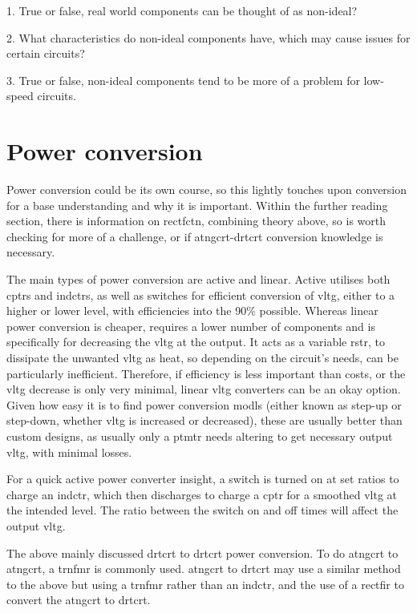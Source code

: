 \documentclass[a4paper,11pt]{report}
\begin{document}
1. True or false, real world components can be thought of as non-ideal?

2. What characteristics do non-ideal components have, which may cause issues for certain circuits?

3. True or false, non-ideal components tend to be more of a problem for low-speed circuits.

\pagebreak

\section{Power conversion}

Power conversion could be its own course, so this lightly touches upon conversion for a base understanding and why it is important. Within the further reading section, there is information on \gls{rectfctn}, combining theory above, so is worth checking for more of a challenge, or if \gls{atngcrt}-\gls{drtcrt} conversion knowledge is necessary.

The main types of power conversion are active and linear. Active utilises both \gls{cptr}s and \gls{indctr}s, as well as switches for efficient conversion of \gls{vltg}, either to a higher or lower level, with efficiencies into the 90\% possible. Whereas linear power conversion is cheaper, requires a lower number of components and is specifically for decreasing the \gls{vltg} at the output. It acts as a variable \gls{rstr}, to dissipate the unwanted \gls{vltg} as heat, so depending on the circuit's needs, can be particularly inefficient. Therefore, if efficiency is less important than costs, or the \gls{vltg} decrease is only very minimal, linear \gls{vltg} converters can be an okay option. Given how easy it is to find power conversion \gls{modl}s (either known as step-up or step-down, whether \gls{vltg} is increased or decreased), these are usually better than custom designs, as usually only a \gls{ptmtr} needs altering to get necessary output \gls{vltg}, with minimal losses.

For a quick active power converter insight, a switch is turned on at set ratios to charge an \gls{indctr}, which then discharges to charge a \gls{cptr} for a smoothed \gls{vltg} at the intended level. The ratio between the switch on and off times will affect the output \gls{vltg}.

The above mainly discussed \gls{drtcrt} to \gls{drtcrt} power conversion. To do \gls{atngcrt} to \gls{atngcrt}, a \gls{trnfmr} is commonly used. \gls{atngcrt} to \gls{drtcrt} may use a similar method to the above but using a \gls{trnfmr} rather than an \gls{indctr}, and the use of a \gls{rectfir} to convert the \gls{atngcrt} to \gls{drtcrt}.
\end{document}
